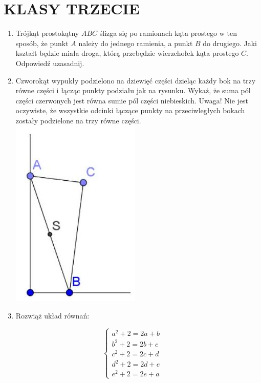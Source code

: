 \documentclass[10pt]{article}
\begin{document}
\section*{KLASY TRZECIE}
\begin{enumerate}
  \item Trójkąt prostokątny \(A B C\) ślizga się po ramionach kąta prostego w ten sposób, że punkt \(A\) należy do jednego ramienia, a punkt \(B\) do drugiego. Jaki kształt będzie miała droga, którą przebędzie wierzchołek kąta prostego \(C\). Odpowiedź uzasadnij.
  \item Czworokąt wypukły podzielono na dziewięć części dzieląc każdy bok na trzy równe części i łącząc punkty podziału jak na rysunku. Wykaż, że suma pól części czerwonych jest równa sumie pól części niebieskich. Uwaga! Nie jest oczywiste, że wszystkie odcinki łączące punkty na przeciwległych bokach zostały podzielone na trzy równe części.\\
\includegraphics[max width=\textwidth, center]{2024_11_21_219d6f5dddf91235b0b5g-1}
  \item Rozwiąż układ równań:
\end{enumerate}

\[
\left\{\begin{array}{l}
a^{2}+2=2 a+b \\
b^{2}+2=2 b+c \\
c^{2}+2=2 c+d \\
d^{2}+2=2 d+e \\
e^{2}+2=2 e+a
\end{array}\right.
\]
\end{document}
